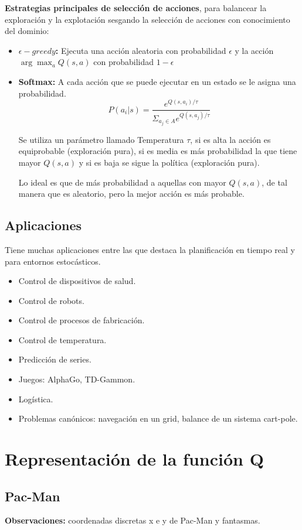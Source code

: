 \documentclass[12pt, twoside, openright]{report} %
\begin{document}
\textbf{Estrategias principales de selección de acciones}, para balancear la exploración y la explotación sesgando la selección de acciones con conocimiento del dominio:
\begin{itemize}
  \item \textbf{$\epsilon-greedy$:} Ejecuta una acción aleatoria con probabilidad $\epsilon$ y la acción $\arg \max_a Q(s, a)$ con probabilidad $1-\epsilon$
  \item \textbf{Softmax:} A cada acción que se puede ejecutar en un estado se le asigna una probabilidad.
  $$ P(a_i|s)= \frac{e^{Q(s, a_i)/\tau}} {\Sigma_{a_j \in A} e^{Q(s, a_j)/\tau}} $$
  
  Se utiliza un parámetro llamado Temperatura $\tau$, si es alta la acción es equiprobable (exploración pura), si es media es más probabilidad la que tiene mayor $Q(s, a)$ y si es baja se sigue la política (exploración pura).

  Lo ideal es que de más probabilidad a aquellas con mayor $Q(s, a)$, de tal manera que es aleatorio, pero la mejor acción es más probable.
\end{itemize}

\subsection{Aplicaciones}
Tiene muchas aplicaciones entre las que destaca la planificación en tiempo real y para entornos estocásticos.
\begin{itemize}
  \item Control de dispositivos de salud.
  \item Control de robots.
  \item Control de procesos de fabricación.
  \item Control de temperatura.
  \item Predicción de series.
  \item Juegos: AlphaGo, TD-Gammon.
  \item Logística.
  \item Problemas canónicos: navegación en un grid, balance de un sistema cart-pole.
\end{itemize}

\section{Representación de la función Q}
\subsection{Pac-Man}
\textbf{Observaciones:} coordenadas discretas x e y de Pac-Man y fantasmas.
\end{document}
